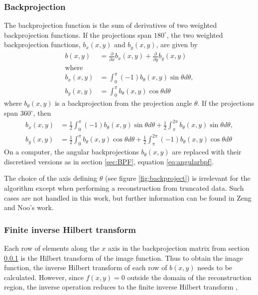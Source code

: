 \documentclass[11pt,a4paper]{article}
\begin{document}
\subsubsection{Backprojection}
\label{sec:bphbp}
The backprojection function is the sum of derivatives of two weighted backprojection functions. If the projections span $180^{\circ}$, the two weighted backprojection functions, $b_x(x,y)$ and $b_y(x,y)$, are given by
\begin{align}
b(x,y) & = \frac{\partial}{\partial x} b_{x}(x,y) + \frac{\partial}{\partial y} b_{y}(x,y) \\
\text{where} & \\
b_x(x,y) & = \int_{0}^{\pi} (-1) b_{\theta}(x,y) \sin \theta d \theta, \\ 
b_y(x,y) & = \int_{0}^{\pi} b_{\theta}(x,y) \cos \theta d\theta
\end{align}
where $b_{\theta}(x,y)$ is a backprojection from the projection angle $\theta$. If the projections span $360^{\circ}$, then
\begin{align}
b_x(x,y) & = \frac{1}{2} \int_{0}^{\pi} (-1) b_{\theta}(x,y) \sin \theta d \theta + \frac{1}{2} \int_{\pi}^{2\pi} b_{\theta}(x,y) \sin \theta d \theta,  \\ 
b_y(x,y) & = \frac{1}{2} \int_{0}^{\pi} b_{\theta}(x,y) \cos \theta d\theta + \frac{1}{2} \int_{\pi}^{2\pi} (-1) b_{\theta}(x,y) \cos \theta d\theta
\end{align}
On a computer, the angular backprojections $b_{\theta}(x,y)$ are replaced with their discretised versions as in section \ref{sec:BPF}, equation \ref{eq:angularbpf}.

The choice of the axis defining $\theta$ (see figure \ref{fig:backproject}) is irrelevant for the algorithm except when performing a reconstruction from truncated data. Such cases are not handled in this work, but further information can be found in Zeng and Noo's work.

\subsubsection{Finite inverse Hilbert transform}
\label{sec:invhil}
Each row of elements along the $x$ axis in the backprojection matrix from section \ref{sec:bphbp} is the Hilbert transform of the image function. Thus to obtain the image function, the inverse Hilbert transform of each row of $b(x,y)$ needs to be calculated. However, since $f(x,y) = 0$ outside the domain of the reconstruction region, the inverse operation reduces to the finite inverse Hilbert transform \parencite{zeng2007two},
\end{document}
